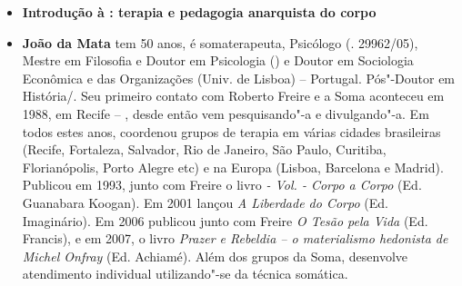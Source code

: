 \begin{itemize}
\item \textbf{Introdução à : terapia e pedagogia anarquista do corpo} \lipsum[1]
  
\item \textbf{João da Mata} tem 50 anos, é somaterapeuta, Psicólogo (. 29962/05), Mestre em Filosofia e Doutor em Psicologia () e Doutor em Sociologia Econômica e das Organizações (Univ. de Lisboa) -- Portugal. Pós"-Doutor em História/.
Seu primeiro contato com Roberto Freire e a Soma aconteceu em 1988, em Recife -- , desde então vem pesquisando"-a e divulgando"-a. Em todos estes anos, coordenou grupos de terapia em várias cidades brasileiras
(Recife, Fortaleza, Salvador, Rio de Janeiro, São Paulo, Curitiba, Florianópolis, Porto Alegre etc) e na Europa (Lisboa, Barcelona e Madrid).
Publicou em 1993, junto com Freire o livro \emph{ - Vol.  - Corpo a Corpo} (Ed. Guanabara Koogan). Em 2001 lançou \emph{A Liberdade do Corpo} (Ed. Imaginário). Em 2006 publicou junto com Freire \emph{O Tesão pela Vida} (Ed. Francis), e em 2007, o livro \emph{Prazer e Rebeldia -- o materialismo hedonista de Michel Onfray} (Ed. Achiamé).
Além dos grupos da Soma, desenvolve atendimento individual utilizando"-se da técnica somática.

\end{itemize}

